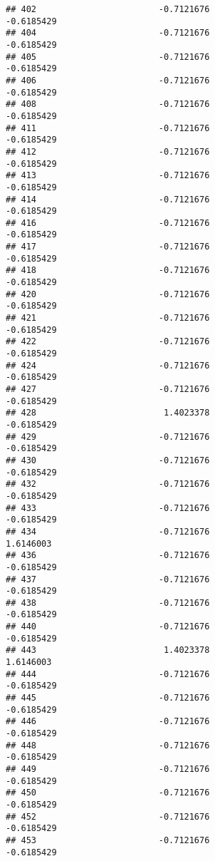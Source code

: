 \documentclass[
]{article}
\begin{document}
\begin{verbatim}
## 402                        -0.7121676                       -0.6185429
## 404                        -0.7121676                       -0.6185429
## 405                        -0.7121676                       -0.6185429
## 406                        -0.7121676                       -0.6185429
## 408                        -0.7121676                       -0.6185429
## 411                        -0.7121676                       -0.6185429
## 412                        -0.7121676                       -0.6185429
## 413                        -0.7121676                       -0.6185429
## 414                        -0.7121676                       -0.6185429
## 416                        -0.7121676                       -0.6185429
## 417                        -0.7121676                       -0.6185429
## 418                        -0.7121676                       -0.6185429
## 420                        -0.7121676                       -0.6185429
## 421                        -0.7121676                       -0.6185429
## 422                        -0.7121676                       -0.6185429
## 424                        -0.7121676                       -0.6185429
## 427                        -0.7121676                       -0.6185429
## 428                         1.4023378                       -0.6185429
## 429                        -0.7121676                       -0.6185429
## 430                        -0.7121676                       -0.6185429
## 432                        -0.7121676                       -0.6185429
## 433                        -0.7121676                       -0.6185429
## 434                        -0.7121676                        1.6146003
## 436                        -0.7121676                       -0.6185429
## 437                        -0.7121676                       -0.6185429
## 438                        -0.7121676                       -0.6185429
## 440                        -0.7121676                       -0.6185429
## 443                         1.4023378                        1.6146003
## 444                        -0.7121676                       -0.6185429
## 445                        -0.7121676                       -0.6185429
## 446                        -0.7121676                       -0.6185429
## 448                        -0.7121676                       -0.6185429
## 449                        -0.7121676                       -0.6185429
## 450                        -0.7121676                       -0.6185429
## 452                        -0.7121676                       -0.6185429
## 453                        -0.7121676                       -0.6185429

\end{verbatim}
\end{document}

